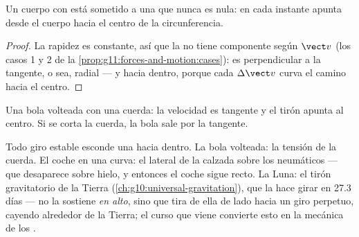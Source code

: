 \begin{proposition}\label{prop:g11:forces-and-motion:inward}
Un cuerpo con  está sometido a una  que nunca es nula: en cada instante apunta desde el cuerpo hacia el
centro de la circunferencia.
\end{proposition}

\begin{proof}
La rapidez es constante, así que la  no tiene componente
según $\vect v$ (los casos 1 y 2 de la
\cref{prop:g11:forces-and-motion:cases}): es perpendicular a la
tangente, o sea, radial --- y hacia dentro, porque cada
$\Delta \vect v$ curva el camino hacia el centro.
\end{proof}

\begin{omfigure}

{\small Una bola volteada con una cuerda: la velocidad es tangente y el
tirón apunta al centro. Si se corta la cuerda, la bola sale por la
tangente.}
\end{omfigure}

\begin{example}\label{ex:g11:forces-and-motion:moon}
Todo giro estable esconde una  hacia dentro. La bola volteada: la
tensión de la cuerda. El coche en una curva: el 
lateral de la calzada sobre los neumáticos --- que desaparece sobre
hielo, y entonces el coche sigue recto. La Luna: el tirón gravitatorio
de la Tierra (\cref{ch:g10:universal-gravitation}), que la hace girar en
\num{27.3} días --- no la sostiene \emph{en alto}, sino que tira de ella
de lado hacia un giro perpetuo, cayendo alrededor de la Tierra; el curso
que viene convierte esto en la mecánica de los .
\end{example}

